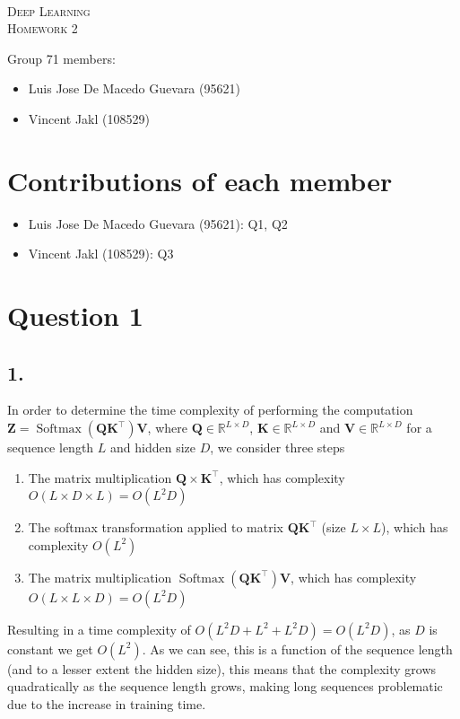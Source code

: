\documentclass[11pt]{article}
\DeclareMathOperator{\softmax}{Softmax}
\begin{document}
\begin{center}
  \mbox{}\\[2.0cm]
  \textsc{\Huge Deep Learning}\\[1.0cm]
  \textsc{\Large Homework 2}\\[0.5cm]
\end{center}
\begin{flushleft}
  Group 71 members: \\[0.5cm]
  \begin{itemize}
  \item Luis Jose De Macedo Guevara (95621)
  \item Vincent Jakl (108529)
  \end{itemize}
\end{flushleft}

\section{Contributions of each member}
\begin{itemize}
    \item Luis Jose De Macedo Guevara (95621): Q1, Q2
    \item Vincent Jakl (108529): Q3
\end{itemize}
\pagebreak
\section{Question 1}
\subsection{1.}
In order to determine the time complexity of performing the computation $\bm{Z} = \softmax \left( \bm{Q} \bm{K}^{\top} \right) \bm{V}$, where $\bm{Q} \in \mathbb{R}^{L \times D}$, $\bm{K} \in \mathbb{R}^{L \times D}$ and $\bm{V} \in \mathbb{R}^{L \times D}$ for a sequence length $L$ and hidden size $D$, we consider three steps
\begin{enumerate}
\item The matrix multiplication $\bm{Q} \times \bm{K}^{\top}$, which has complexity $O \left( L \times D \times L \right) = O \left( L^{2} D \right)$
\item The softmax transformation applied to matrix $\bm{Q} \bm{K}^{\top}$ (size $L \times L$), which has complexity $O \left( L^{2} \right)$
\item The matrix multiplication $\softmax \left( \bm{Q} \bm{K}^{\top} \right) \bm{V}$, which has complexity $O \left( L \times L \times D \right) = O \left( L^{2} D \right)$
\end{enumerate}
Resulting in a time complexity of $O \left( L^{2}D + L^{2} + L^{2}D \right) = O \left( L^{2} D \right)$, as $D$ is constant we get $O \left( L^{2} \right)$. As we can see, this is a function of the sequence length (and to a lesser extent the hidden size), this means that the complexity grows quadratically as the sequence length grows, making long sequences problematic due to the increase in training time.
\end{document}
